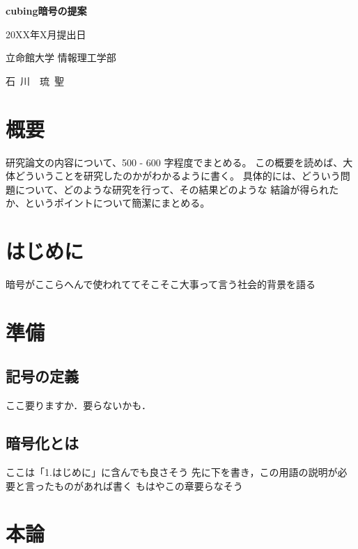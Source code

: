 \documentclass{jsarticle}
\begin{document}
\thispagestyle{empty}
\begin{center}
\vspace*{4.5cm}
{\huge\bf cubing暗号の提案}
\vspace*{3cm}

{\large 20XX年X月提出日}
\vspace*{3cm}

{\large 立命館大学 情報理工学部}
\vspace*{5mm}

{\Large 石~川~~琉~聖}
\end{center}
\newpage 

\setcounter{page}{1}

\section*{概要}

研究論文の内容について、500 - 600 字程度でまとめる。
この概要を読めば、大体どういうことを研究したのかがわかるように書く。
具体的には、どういう問題について、どのような研究を行って、その結果どのような
結論が得られたか、というポイントについて簡潔にまとめる。

\newpage

\tableofcontents
\clearpage

\section{はじめに}
暗号がここらへんで使われててそこそこ大事って言う社会的背景を語る

\section{準備}
\subsection{記号の定義}
ここ要りますか．要らないかも．
\subsection{暗号化とは}
ここは「1.はじめに」に含んでも良さそう
先に下を書き，この用語の説明が必要と言ったものがあれば書く
もはやこの章要らなそう

\section{本論}
\end{document}
